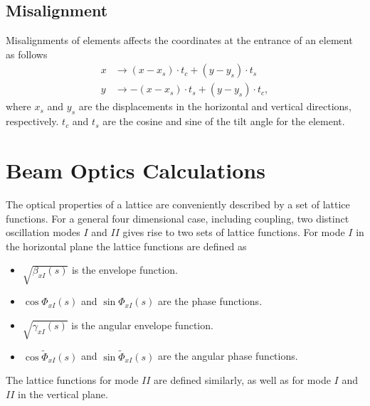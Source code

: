 \documentclass[english]{article}
\begin{document}
\subsection{Misalignment}

Misalignments of elements affects the coordinates at the entrance of an
element as follows
\begin{align}
    x &\to (x-x_s)\cdot t_c + (y-y_s)\cdot t_s \\
    y &\to -(x-x_s)\cdot t_s + (y-y_s)\cdot t_c,
\end{align}
where $x_s$ and $y_s$ are the displacements in the horizontal and vertical
directions, respectively. $t_c$ and $t_s$ are the cosine and sine of the tilt
angle for the element.

\section{Beam Optics Calculations}

The optical properties of a lattice are conveniently described by a set of
lattice functions. For a general four dimensional case, including coupling,
two distinct oscillation modes $I$ and $II$ gives rise to two sets of lattice
functions. For mode $I$ in the horizontal plane the lattice functions are
defined
as \cite{beamoptics}
\begin{itemize}
    \item $\sqrt{\beta_{xI}(s)}$ is the envelope function.
    \item $\cos\Phi_{xI}(s)$ and $\sin\Phi_{xI}(s)$ are the phase functions.
    \item $\sqrt{\gamma_{xI}(s)}$ is the angular envelope function.
    \item $\cos\tilde{\Phi}_{xI}(s)$ and $\sin\tilde{\Phi}_{xI}(s)$  are the
  angular phase functions.
\end{itemize}
The lattice functions for mode $II$ are defined similarly, as well as for mode
$I$ and $II$ in the vertical plane.
\end{document}
